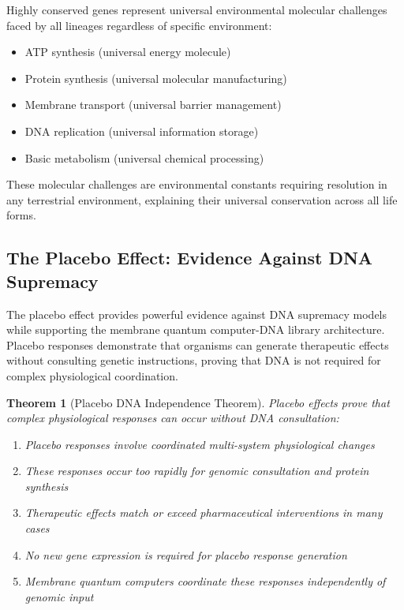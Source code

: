 \documentclass[12pt,a4paper]{article}
\newtheorem{theorem}{Theorem}[section]
\begin{document}
Highly conserved genes represent universal environmental molecular challenges faced by all lineages regardless of specific environment:
\begin{itemize}
\item ATP synthesis (universal energy molecule)
\item Protein synthesis (universal molecular manufacturing)  
\item Membrane transport (universal barrier management)
\item DNA replication (universal information storage)
\item Basic metabolism (universal chemical processing)
\end{itemize}

These molecular challenges are environmental constants requiring resolution in any terrestrial environment, explaining their universal conservation across all life forms.

\subsection{The Placebo Effect: Evidence Against DNA Supremacy}

The placebo effect provides powerful evidence against DNA supremacy models while supporting the membrane quantum computer-DNA library architecture. Placebo responses demonstrate that organisms can generate therapeutic effects without consulting genetic instructions, proving that DNA is not required for complex physiological coordination.

\begin{theorem}[Placebo DNA Independence Theorem]
Placebo effects prove that complex physiological responses can occur without DNA consultation:
\begin{enumerate}
\item Placebo responses involve coordinated multi-system physiological changes
\item These responses occur too rapidly for genomic consultation and protein synthesis
\item Therapeutic effects match or exceed pharmaceutical interventions in many cases
\item No new gene expression is required for placebo response generation
\item Membrane quantum computers coordinate these responses independently of genomic input
\end{enumerate}
\end{theorem}
\end{document}
